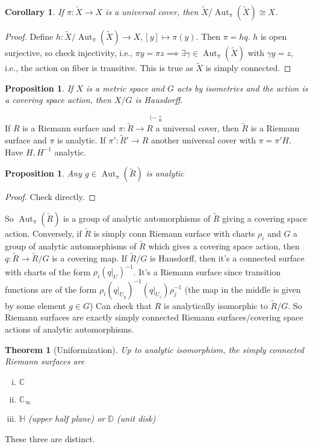 \documentclass{article}
\theoremstyle{definition}
\theoremstyle{remark}
\theoremstyle{plain}
\newtheorem{thm}[defn]{Theorem}
\newtheorem{prop}[defn]{Proposition}
\newtheorem{crly}[defn]{Corollary}
\newcommand{\CC}{\mathbb{C}}
\begin{document}
\begin{crly}
    If $\pi:\tilde X\to X$ is a universal cover, then $\tilde X/\operatorname{Aut}_\pi(\tilde X)\cong X$.
\end{crly}
\begin{proof}
    Define $h:\tilde X/\operatorname{Aut}_\pi(\tilde X)\to X, [y]\mapsto \pi(y)$. Then $\pi=hq$. $h$ is open surjective, so check injectivity, i.e., $\pi y=\pi z\implies \exists \gamma\in\operatorname{Aut}_\pi(\tilde X)$ with $\gamma y=z$, i.e., the action on fiber is transitive. This is true as $\tilde X$ is simply connected.
\end{proof}
\begin{prop}
     If $X$ is a metric space and $G$ acts by isometries and the action is a covering space action, then $X/G$ is Hausdorff.
\end{prop}
\[{}^{(-}\overset{\circ}{\circ}\tag{Owen's signature}\]
If $R$ is a Riemann surface and $\pi:\tilde R\to R$ a universal cover, then $\tilde R$ is a Riemann surface and $\pi$ is analytic. If $\pi':\tilde R'\to R$ another universal cover with $\pi=\pi' H$. Have $H, H^{-1}$ analytic.
\begin{prop}
    Any $g\in\operatorname{Aut}_\pi(\tilde R)$ is analytic
\end{prop}
\begin{proof}
    Check directly.
\end{proof}
So $\operatorname{Aut}_\pi(\tilde R)$ is a group of analytic automorphisms of $\tilde R$ giving a covering space action. Conversely, if $\tilde R$ is simply conn Riemann surface with charts $\rho_i$ and $G$ a group of analytic automorphisms of $\tilde R$ which gives a covering space action, then $q:\tilde R\to\tilde R/G$ is a covering map. If $\tilde R/G$ is Hausdorff, then it's a connected surface with charts of the form $\rho_i(q|_{U})^{-1}$. It's a Riemann surface since transition functions are of the form $\rho_i(q|_{U_y})^{-1}(q|_{U_z})\rho_j^{-1}$ (the map in the middle is given by some element $g\in G$) Can check that $R$ is analytically isomorphic to $\tilde R/G$. So Riemann surfaces are exactly simply connected Riemann surfaces/covering space actions of analytic automorphisms.
\begin{thm}[Uniformization]
    Up to analytic isomorphism, the simply connected Riemann surfaces are \begin{enumerate}[(i)]
        \item $\CC$
        \item $\CC_\infty$
        \item $\mathbb H$ (upper half plane) or $\mathbb D$ (unit disk)
    \end{enumerate}
\end{thm}
These three are distinct.
\end{document}
